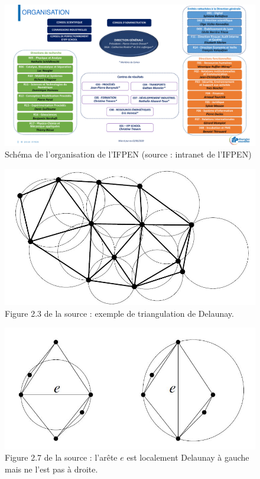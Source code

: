 \documentclass[12pt,a4paper]{report}
\begin{document}
\begin{center}
\begin{figure}[htbp]
\includegraphics[scale=0.6, angle=90]{vf-schema-organisation-ifpen-marguerite.pdf}
\caption{Schéma de l'organisation de l'IFPEN (source : intranet de l'IFPEN)}
\label{ifpen_org}
\end{figure}
\end{center}
\clearpage

\begin{figure}[t]
\begin{center}
\includegraphics[scale=0.7]{delTri.jpg}
\caption{Figure 2.3 de la source \cite{delnotes} : exemple de triangulation de Delaunay.}
\label{delaunay}
\end{center}
\end{figure}

\begin{figure}[h]
\begin{center}
\includegraphics[scale=0.7]{locDel.jpg}
\caption{Figure 2.7 de la source \cite{delnotes} : l'arête $e$ est localement Delaunay à gauche mais ne l'est pas à droite.}
\end{center}
\label{loc_delaunay}
\end{figure}
\end{document}
